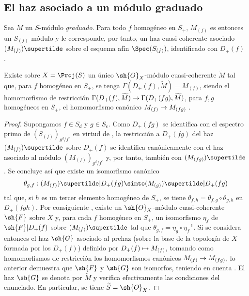 \documentclass[oneside,10pt]{amsart}
\makeatletter
\newcommand{\ega@arrow}[2]{\mathchoice{#1}{#2}{#2}{#2}}
\let\ega@shortmapsto\mapsto
\renewcommand{\to}{\ega@arrow{\longrightarrow}{\rightarrow}}
\renewcommand{\mapsto}{\ega@arrow{\longmapsto}{\ega@shortmapsto}}
\newcommand{\oldpage}[2][]{\marginnote{\normalfont\footnotesize\textbf{#1}~|~#2}\ignorespaces}
\let\EGAOriginalLabel\label
\renewcommand{\label}[1]{\phantomsection\EGAOriginalLabel{#1}}
\makeatother
\begin{document}
\subsection{El haz asociado a un módulo graduado}
\label{subsection:II.2.5}

\begin{env}[2.5.1]
\label{II.2.5.1}
Sea $M$ un $S$-módulo \emph{graduado}.
Para todo $f$ homogéneo en $S_+$, $M_{(f)}$ es entonces un $S_{(f)}$-módulo y le corresponde, por tanto, un haz cuasi-coherente asociado $(M_{(f)})\supertilde$ sobre el esquema afín $\Spec(S_{(f)})$, identificado con $D_+(f)$ .
\end{env}

\oldpage[II]{31}
\begin{proposition}[2.5.2]
\label{II.2.5.2}
Existe sobre $X=\Proj(S)$ un único $\sh{O}_X$-módulo cuasi-coherente $\widetilde{M}$ tal que, para $f$ homogéneo en $S_+$, se tenga $\Gamma(D_+(f),\widetilde{M})=M_{(f)}$, siendo el homomorfismo de restricción $\Gamma(D_+(f),\widetilde{M})\to\Gamma(D_+(fg),\widetilde{M})$, para $f,g$ homogéneos en $S_+$, el homomorfismo canónico $M_{(f)}\to M_{(fg)}$ .
\end{proposition}

\begin{proof}
Supongamos $f\in S_d$ y $g\in S_e$.
Como $D_+(fg)$ se identifica con el espectro primo de $(S_{(f)})_{g^d/f^e}$ en virtud de , la restricción a $D_+(fg)$ del haz $(M_{(f)})\supertilde$ sobre $D_+(f)$ se identifica canónicamente con el haz asociado al módulo $(M_{(f)})_{g^d/f^e}$  y, por tanto, también con $(M_{(fg)})\supertilde$ .
Se concluye así que existe un isomorfismo canónico
\[
  \theta_{g,f}:(M_{(f)})\supertilde|D_+(fg)
  \simto(M_{(g)})\supertilde|D_+(fg)
\]
tal que, si $h$ es un tercer elemento homogéneo de $S_+$, se tiene $\theta_{f,h}=\theta_{f,g}\circ\theta_{g,h}$ en $D_+(fgh)$.
Por consiguiente , existe un $\sh{O}_X$-módulo cuasi-coherente $\sh{F}$ sobre $X$ y, para cada $f$ homogéneo en $S_+$, un isomorfismo $\eta_f$ de $\sh{F}|D_+(f)$ sobre $(M_{(f)})\supertilde$ tal que $\theta_{g,f}=\eta_g\circ\eta_f^{-1}$.
Si se considera entonces el haz $\sh{G}$ asociado al prehaz (sobre la base de la topología de $X$ formada por los $D_+(f)$) definido por $D_+(f)\mapsto M_{(f)}$, tomando como homomorfismos de restricción los homomorfismos canónicos $M_{(f)}\to M_{(fg)}$, lo anterior demuestra que $\sh{F}$ y $\sh{G}$ son isomorfos, teniendo en cuenta .
El haz $\sh{G}$ se denota por $\widetilde{M}$ y verifica efectivamente las condiciones del enunciado.
En particular, se tiene $\widetilde{S}=\sh{O}_X$.
\end{proof}
\end{document}
